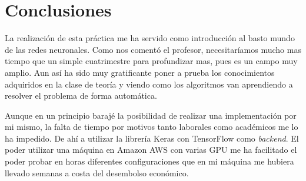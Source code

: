 \chapter{Conclusiones}

La realización de esta práctica me ha servido como introducción al basto mundo de las redes neuronales. Como nos comentó el profesor, necesitaríamos mucho mas tiempo que un simple cuatrimestre para profundizar mas, pues es un  campo muy amplio. Aun así ha sido muy gratificante poner a prueba los conocimientos adquiridos en la clase de teoría y viendo como los algoritmos van aprendiendo a resolver el problema de forma automática.

\bigskip
Aunque en un principio barajé la posibilidad de realizar una implementación por mi mismo, la falta de tiempo por motivos tanto laborales como académicos me lo ha impedido. De ahí a utilizar la librería Keras con TensorFlow como \textit{backend}. El poder utilizar una máquina en Amazon AWS con varias GPU me ha facilitado el poder probar en horas diferentes configuraciones que en mi máquina me hubiera llevado semanas a costa del desembolso económico.


